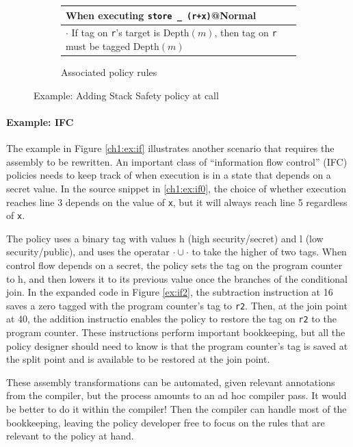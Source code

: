 \begin{figure}
\begin{subfigure}{\textwidth}
    \begin{tabular}{|l|}
      \hline
      When executing {\tt store \_ (r+x)}@{\sc Normal} \\
      \hline
      \rowcolor{blue!30}
      \(\cdot\) If tag on {\tt r}'s target is {\sc Depth}\((m)\), then
      tag on {\tt r} must be tagged {\sc Depth}\((m)\) \\
      \hline
    \end{tabular}
    \caption{Associated policy rules}
    \label{ch1:ex:call3}
  \end{subfigure}

  \caption{Example: Adding Stack Safety policy at call}
  \label{ch1:ex:call}
\end{figure}

\paragraph{Example: IFC}

The example in Figure \ref{ch1:ex:if} illustrates another scenario that requires the assembly to be
rewritten. An important class of ``information flow control'' (IFC) policies needs to keep track
of when execution is in a state that depends on a secret value. In the source snippet in \ref{ch1:ex:if0},
the choice of whether execution reaches line 3 depends on the value of {\tt x},
but it will always reach line 5 regardless of {\tt x}.

The policy uses a binary tag with values {\sc h} (high security/secret) and
{\sc l} (low security/public), and uses the operatar \(\cdot \cup \cdot\) to take the higher
of two  tags. When control flow depends on a secret, the policy sets the tag on the
program counter to {\sc h}, and then lowers it to its previous value once the branches of the
conditional join. In the expanded code in Figure \ref{ex:if2},
the subtraction instruction at 16 saves a zero tagged with the program counter's tag to {\tt r2}.
Then, at the join point at 40, the addition instructio enables the policy to restore the tag on
{\tt r2} to the program counter. These instructions perform important bookkeeping,
but all the policy designer should need to know is that the program counter's 
tag is saved at the split point and is available to be restored at the join point.

These assembly transformations can be automated, given relevant annotations from
the compiler, but the process amounts to an ad hoc compiler pass. It would be better to do it
within the compiler! Then the compiler can handle most of the bookkeeping, leaving the policy
developer free to focus on the rules that are relevant to the policy at hand.

